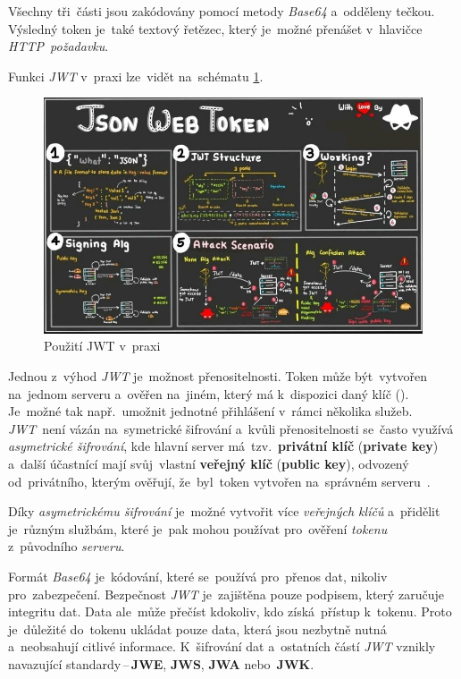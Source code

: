 \documentclass[11pt,a4paper]{report}
\let\oldacrshort\acrshort
\renewcommand{\acrshort}[1]{\emph{\normalsize\color[rgb]{0,0,0}\noindent\oldacrshort{#1}}}
\begin{document}
                Všechny tři~části jsou zakódovány pomocí metody \emph{Base64} a~odděleny tečkou. Výsledný token je~také textový řetězec, který je~možné přenášet v~hlavičce \emph{HTTP~požadavku}.

                Funkci \acrshort{JWT} v~praxi lze~vidět na~schématu \ref{model-jwt}.

                \begin{figure}
                    \centering
                    \includegraphics[width=.9\linewidth]{./files/img/jwt.jpg}
                    \caption{Použití JWT v~praxi}
                    \label{model-jwt}
                \end{figure}

                Jednou z~výhod \acrshort{JWT} je~možnost přenositelnosti. Token může být~vytvořen na~jednom serveru a~ověřen na~jiném, který má k~dispozici daný klíč (\cite{ieee:jwt}). Je~možné tak např.~umožnit jednotné přihlášení v~rámci několika služeb. \acrshort{JWT}~není vázán na~symetrické šifrování a~kvůli přenositelnosti se~často využívá \emph{asymetrické šifrování}, kde hlavní server má~tzv.~\textbf{privátní klíč} (\textbf{private key}) a~další účastnící mají svůj~vlastní \textbf{veřejný klíč} (\textbf{public key}), odvozený od~privátního, kterým ověřují, že~byl~token vytvořen na~správném serveru~\cite{miguelgrinbergJSONTokens}.
                
                Díky \emph{asymetrickému šifrování} je~možné vytvořit více \emph{veřejných klíčů} a~přidělit je~různým službám, které je~pak mohou používat pro~ověření \emph{tokenu} z~původního \emph{serveru}.

                Formát \emph{Base64} je~kódování, které se~používá pro~přenos dat, nikoliv pro~zabezpečení. Bezpečnost \acrshort{JWT} je~zajištěna pouze podpisem, který zaručuje integritu dat. Data ale~může přečíst kdokoliv, kdo získá~přístup k~tokenu. Proto je~důležité do~tokenu ukládat pouze data, která jsou nezbytně nutná a~neobsahují citlivé informace. K~šifrování dat a~ostatních částí \acrshort{JWT} vznikly navazující standardy\,--\,\textbf{JWE}, \textbf{JWS}, \textbf{JWA} nebo~\textbf{JWK}.~\cite{jwtesak, graham2021ethical}
\end{document}
